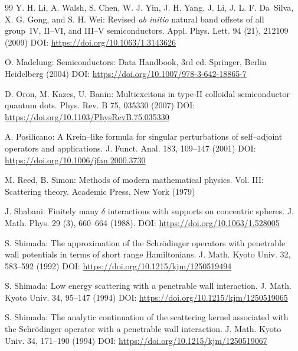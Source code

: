 \documentclass[a4paper,11pt]{article}
\numberwithin{equation}{section}
\theoremstyle{definition}
\theoremstyle{remark}
\begin{document}
\begin{thebibliography}{99}
Y. H. Li, A. Walsh, S. Chen, W. J. Yin, J. H. Yang, J. Li,
J. L. F. Da~Silva, X. G. Gong, and S. H. Wei:
Revised \textit{ab initio} natural band offsets of all group~IV, II--VI,
and III--V semiconductors.
Appl. Phys. Lett. 94 (21), 212109 (2009)
\newline DOI: \url{https://doi.org/10.1063/1.3143626}

O. Madelung:
Semiconductors: Data Handbook, 3rd ed.
Springer, Berlin Heidelberg (2004)
\newline DOI: \url{https://doi.org/10.1007/978-3-642-18865-7}

D. Oron, M. Kazes, U. Banin:
Multiexcitons in type-II colloidal semiconductor quantum dots.
Phys. Rev. B 75, 035330 (2007)
\newline DOI: \url{https://doi.org/10.1103/PhysRevB.75.035330}

A. Posilicano:
A Krein--like formula for singular perturbations of self--adjoint operators and applications.
J. Funct. Anal. 183, 109--147 (2001)
\newline DOI: \url{https://doi.org/10.1006/jfan.2000.3730}

M. Reed, B. Simon:
Methods of modern mathematical physics. Vol. III: Scattering theory.
Academic Press, New York (1979)

J. Shabani:
Finitely many $\delta$ interactions with supports on concentric spheres.
J. Math. Phys. 29 (3), 660--664 (1988).
\newline DOI: \url{https://doi.org/10.1063/1.528005}

S. Shimada:
The approximation of the Schr\"odinger operators with penetrable
wall potentials in terms of short range Hamiltonians.
J. Math. Kyoto Univ. 32, 583--592 (1992)
\newline DOI: \url{https://doi.org/10.1215/kjm/1250519494}

S. Shimada:
Low energy scattering with a penetrable wall interaction.
J. Math. Kyoto Univ. 34, 95--147 (1994)
\newline DOI: \url{https://doi.org/10.1215/kjm/1250519065}

S. Shimada:
The analytic continuation of the scattering kernel associated with
the Schr\"odinger operator with a penetrable wall interaction.
J. Math. Kyoto Univ. 34, 171--190 (1994)
\newline DOI: \url{https://doi.org/10.1215/kjm/1250519067}

\end{thebibliography}
\end{document}
